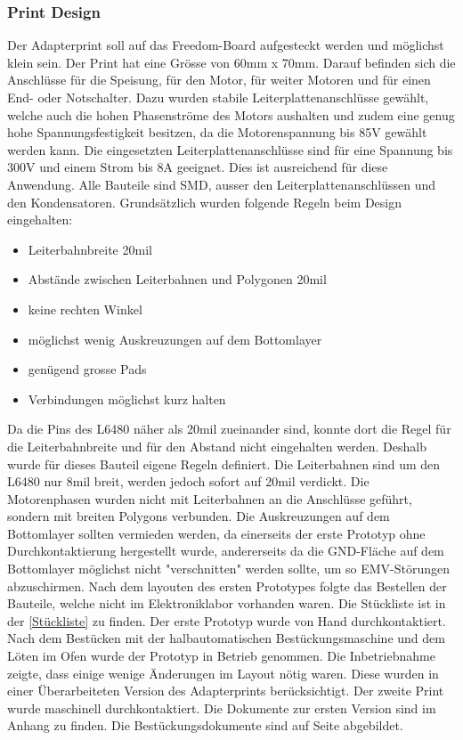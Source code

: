 	\subsubsection{Print Design} \label{sec:PrintDesigna}
	\fi
	Der Adapterprint soll auf das Freedom-Board aufgesteckt werden und möglichst klein sein. Der Print hat eine Grösse von 60mm x 70mm. Darauf befinden sich die Anschlüsse für die Speisung, für den Motor, für weiter Motoren und für einen End- oder Notschalter. Dazu wurden stabile Leiterplattenanschlüsse gewählt, welche auch die hohen Phasenströme des Motors aushalten und zudem eine genug hohe Spannungsfestigkeit besitzen, da die Motorenspannung bis 85V gewählt werden kann. Die eingesetzten Leiterplattenanschlüsse sind für eine Spannung bis 300V und einem Strom bis 8A geeignet. Dies ist ausreichend für diese Anwendung. Alle Bauteile sind SMD, ausser den Leiterplattenanschlüssen und den Kondensatoren.
	\newpage
	Grundsätzlich wurden folgende Regeln beim Design eingehalten: 
	\begin{itemize}
		\item Leiterbahnbreite 20mil
		\item Abstände zwischen Leiterbahnen und Polygonen 20mil
		\item keine rechten Winkel
		\item möglichst wenig Auskreuzungen auf dem Bottomlayer
		\item genügend grosse Pads 
		\item Verbindungen möglichst kurz halten
	\end{itemize}
	Da die Pins des L6480 näher als 20mil zueinander sind, konnte dort die Regel für die Leiterbahnbreite und für den Abstand nicht eingehalten werden. Deshalb wurde für dieses Bauteil eigene Regeln definiert. Die Leiterbahnen sind um den L6480 nur 8mil breit, werden jedoch sofort auf 20mil verdickt. Die Motorenphasen wurden nicht mit Leiterbahnen an die Anschlüsse geführt, sondern mit breiten Polygons verbunden. Die Auskreuzungen auf dem Bottomlayer sollten vermieden werden, da einerseits der erste Prototyp ohne Durchkontaktierung hergestellt wurde, andererseits da die GND-Fläche auf dem Bottomlayer möglichst nicht "verschnitten" werden sollte, um so EMV-Störungen abzuschirmen.
	Nach dem layouten des ersten Prototypes folgte das Bestellen der Bauteile, welche nicht im Elektroniklabor vorhanden waren. Die Stückliste ist in der \autoref{Stückliste} zu finden. Der erste Prototyp wurde von Hand durchkontaktiert. Nach dem Bestücken mit der halbautomatischen Bestückungsmaschine und dem Löten im Ofen wurde der Prototyp in Betrieb genommen. Die Inbetriebnahme zeigte, dass einige wenige Änderungen im Layout nötig waren. Diese wurden in einer Überarbeiteten Version des Adapterprints berücksichtigt. Der zweite Print wurde maschinell durchkontaktiert. Die Dokumente zur ersten Version sind im Anhang zu finden. Die Bestückungsdokumente sind auf Seite \pageref{fig:Bottom Layer} abgebildet.
